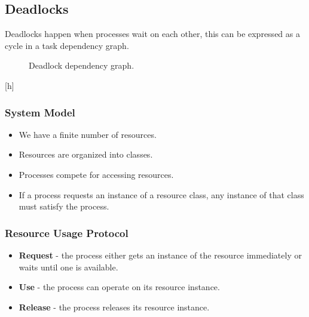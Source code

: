 \subsection{Deadlocks}

Deadlocks happen when processes wait on each other,
this can be expressed as a cycle in a task dependency graph.

\begin{figure}[h]
    \centering
    \caption{Deadlock dependency graph.}
    \label{fig:deadlock}
\end{figure}[h]

\subsubsection{System Model}
\begin{itemize}
    \item We have a finite number of resources.
    \item Resources are organized into classes.
    \item Processes compete for accessing resources.
    \item If a process requests an instance of a resource class,
    any instance of that class must satisfy the process.
\end{itemize}

\subsubsection{Resource Usage Protocol}
\begin{itemize}
    \item \textbf{Request} - the process either gets an instance of the resource immediately or waits until one is available.
    \item \textbf{Use} - the process can operate on its resource instance.
    \item \textbf{Release} - the process releases its resource instance.
\end{itemize}

